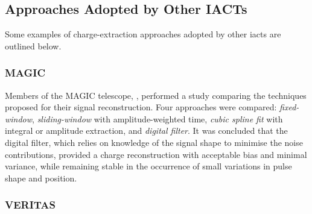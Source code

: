 
\subsection{Approaches Adopted by Other IACTs}

Some examples of charge-extraction approaches adopted by other \glspl{iact} are outlined below.

\subsubsection{MAGIC}

Members of the MAGIC telescope, \textcite{Albert2008}, performed a study comparing the techniques proposed for their signal reconstruction. Four approaches were compared: \textit{fixed-window}, \textit{sliding-window} with amplitude-weighted time, \textit{cubic spline fit} with integral or amplitude extraction, and \textit{digital filter}. It was concluded that the digital filter, which relies on knowledge of the signal shape to minimise the noise contributions, provided a charge reconstruction with acceptable bias and minimal variance, while remaining stable in the occurrence of small variations in pulse shape and position.

\subsubsection{VERITAS}

